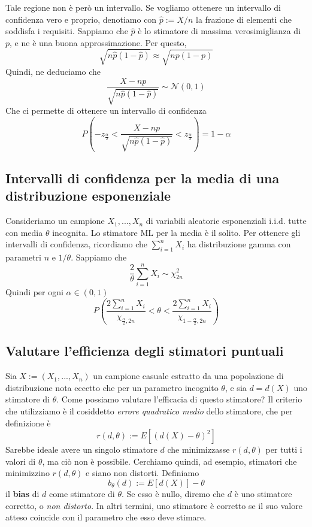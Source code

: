 \documentclass[11pt]{article}
\begin{document}
Tale regione non è però un intervallo. Se vogliamo ottenere un intervallo di confidenza vero e proprio, denotiamo con $\hat{p}:=X/n$ la frazione di elementi che soddisfa i requisiti. Sappiamo che $\hat{p}$ è lo stimatore di massima verosimiglianza di $p$, e ne è una buona approssimazione. Per questo, 
\begin{displaymath}
    \sqrt{n\hat{p}(1-\hat{p})} \approx \sqrt{np(1-p)}
\end{displaymath}
Quindi, ne deduciamo che 
\begin{displaymath}
    \frac{X-np}{\sqrt{n\hat{p}(1-\hat{p})}}\sim \mathcal{N}(0,1)
\end{displaymath}
Che ci permette di ottenere un intervallo di confidenza
\begin{displaymath}
    P\left(-z_{\frac{\alpha}{2}} < \frac{X-np}{\sqrt{n\hat{p}(1-\hat{p})}} <  z_{\frac{\alpha}{2}}\right) = 1-\alpha 
\end{displaymath}
\subsection{Intervalli di confidenza per la media di una distribuzione esponenziale}
Consideriamo un campione $X_1,...,X_n$ di variabili aleatorie esponenziali i.i.d. tutte con media $\theta$ incognita. Lo stimatore ML per la media è il solito. Per ottenere gli intervalli di confidenza, ricordiamo che $\sum_{i=1}^n X_i$ ha distribuzione gamma con parametri $n$ e $1/\theta$. Sappiamo che
\begin{displaymath}
    \frac{2}{\theta}\sum_{i=1}^n X_i \sim \chi_{2n}^2
\end{displaymath}
Quindi per ogni $\alpha \in (0,1)$
\begin{displaymath}
    P\left(\frac{2\sum_{i=1}^n X_i}{\chi_{\frac{\alpha}{2},2n}} < \theta <   \frac{2\sum_{i=1}^n X_i}{\chi_{1-\frac{\alpha}{2},2n}}  \right)
\end{displaymath} 
\subsection{Valutare l'efficienza degli stimatori puntuali}
Sia $X:=(X_1,...,X_n)$ un campione casuale estratto da una popolazione di distribuzione nota eccetto che per un parametro incognito $\theta$, e sia $d=d(X)$ uno stimatore di $\theta$. Come possiamo valutare l'efficacia di questo stimatore?
Il criterio che utilizziamo è il cosiddetto \textit{errore quadratico medio} dello stimatore, che per definizione è
\begin{displaymath}
    r(d,\theta) := E[(d(X)-\theta)^2]
\end{displaymath}
Sarebbe ideale avere un singolo stimatore $d$ che minimizzasse $r(d,\theta)$ per tutti i valori di $\theta$, ma ciò non è possibile. Cerchiamo quindi, ad esempio, stimatori che minimizzino $r(d,\theta)$ e siano non distorti. Definiamo
\begin{displaymath}
    b_\theta (d) := E[d(X)] - \theta
\end{displaymath}
il \textbf{bias} di $d$ come stimatore di $\theta$. Se esso è nullo, diremo che $d$ è uno stimatore corretto, o \textit{non distorto}. In altri termini, uno stimatore è corretto se il suo valore atteso coincide con il parametro che esso deve stimare.
\end{document}
